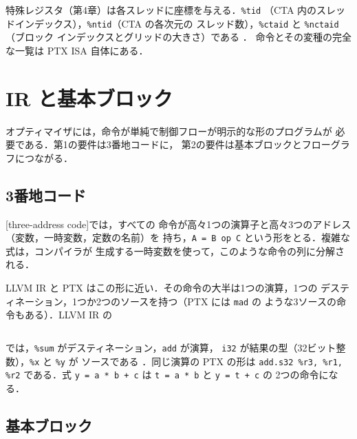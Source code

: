 \documentclass[../main.tex]{subfiles}
\begin{document}
特殊レジスタ（第4章）は各スレッドに座標を与える．\texttt{\%tid}
（CTA 内のスレッドインデックス），\texttt{\%ntid}（CTA の各次元の
スレッド数），\texttt{\%ctaid} と \texttt{\%nctaid}（ブロック
インデックスとグリッドの大きさ）である \cite[§10]{nvidia2026ptx}．
命令とその変種の完全な一覧は PTX ISA 自体にある．

\section{IR と基本ブロック}
\label{sec:l10-ir}

オプティマイザには，命令が単純で制御フローが明示的な形のプログラムが
必要である．第1の要件は3番地コードに，
第2の要件は基本ブロックとフローグラフにつながる．

\subsection{3番地コード}

\begin{definition}[3番地コード]
  [three-address code]では，すべての
  命令が高々1つの演算子と高々3つのアドレス（変数，一時変数，定数の名前）を
  持ち，\texttt{A = B op C} という形をとる．複雑な式は，コンパイラが
  生成する一時変数を使って，このような命令の列に分解される．
\end{definition}

LLVM IR と PTX はこの形に近い．その命令の大半は1つの演算，1つの
デスティネーション，1つか2つのソースを持つ（PTX には \texttt{mad} の
ような3ソースの命令もある）．LLVM IR の
\begin{lstlisting}[language=C++, numbers=none]
%sum = add i32 %x, %y
\end{lstlisting}
では，\texttt{\%sum} がデスティネーション，\texttt{add} が演算，
\texttt{i32} が結果の型（32ビット整数），\texttt{\%x} と \texttt{\%y} が
ソースである \cite{llvm2026langref}．同じ演算の PTX の形は
\texttt{add.s32 \%r3, \%r1, \%r2} である．式
\texttt{y = a * b + c} は \texttt{t = a * b} と \texttt{y = t + c} の
2つの命令になる．

\subsection{基本ブロック}
\end{document}
